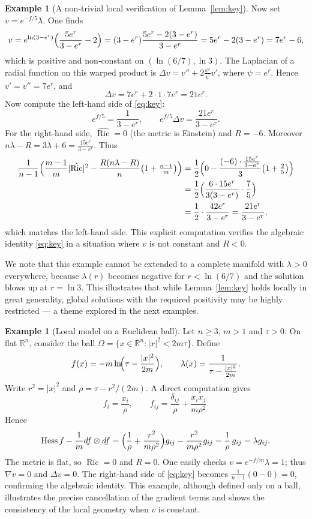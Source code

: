 \documentclass[12pt,a4paper]{article}
\newcommand{\Ric}{\operatorname{Ric}}
\newcommand{\Hess}{\operatorname{Hess}}
\theoremstyle{definition}
\newtheorem{example}[theorem]{Example}
\theoremstyle{definition}
\begin{document}
\begin{example}[A non‑trivial local verification of Lemma~\ref{lem:key}]
Now set $v = e^{-f/5}\lambda$.
One finds
\[
v = e^{\ln(3-e^{r})}\Bigl(\frac{5e^{r}}{3-e^{r}} - 2\Bigr)
= (3-e^{r})\frac{5e^{r} - 2(3-e^{r})}{3-e^{r}} = 5e^{r} - 2(3-e^{r}) = 7e^{r} - 6,
\]
which is positive and non‑constant on $(\ln(6/7),\ln 3)$.
The Laplacian of a radial function on this warped product is
$\Delta v = v'' + 2\frac{\psi'}{\psi}v'$, where $\psi=e^{r}$.
Hence $v' = v'' = 7e^{r}$, and
\[
\Delta v = 7e^{r} + 2\cdot 1 \cdot 7e^{r} = 21e^{r}.
\]
Now compute the left‑hand side of \eqref{eq:key}:
\[
e^{f/5} = \frac{1}{3-e^{r}},\qquad
e^{f/5}\Delta v = \frac{21e^{r}}{3-e^{r}}.
\]
For the right‑hand side, $\hat{\Ric}=0$ (the metric is Einstein) and $R=-6$.
Moreover $n\lambda - R = 3\lambda + 6 = \frac{15e^{r}}{3-e^{r}}$.
Thus
\begin{align*}
\frac{1}{n-1}\Bigl(\frac{m-1}{m}|\hat{\Ric}|^{2} -
\frac{R(n\lambda-R)}{n}\bigl(1+\tfrac{n-1}{m}\bigr)\Bigr)
&= \frac{1}{2}\Bigl(0 - \frac{(-6)\cdot\frac{15e^{r}}{3-e^{r}}}{3}\bigl(1+\tfrac{2}{5}\bigr)\Bigr)\\
&= \frac{1}{2}\Bigl( \frac{6\cdot 15e^{r}}{3(3-e^{r})}\cdot \frac{7}{5} \Bigr)\\
&= \frac{1}{2}\cdot \frac{42e^{r}}{3-e^{r}}
= \frac{21e^{r}}{3-e^{r}},
\end{align*}
which matches the left‑hand side.
This explicit computation verifies the algebraic identity \eqref{eq:key} in a situation where $v$ is not constant and $R<0$.

We note that this example cannot be extended to a complete manifold with $\lambda>0$ everywhere, because $\lambda(r)$ becomes negative for $r<\ln(6/7)$ and the solution blows up at $r=\ln 3$.
This illustrates that while Lemma~\ref{lem:key} holds locally in great generality, global solutions with the required positivity may be highly restricted --- a theme explored in the next examples.
\end{example}

\begin{example}[Local model on a Euclidean ball]\label{ex:local}
Let $n\ge 3$, $m>1$ and $\tau>0$.
On flat $\mathbb{R}^{n}$, consider the ball $\Omega = \{x\in\mathbb{R}^{n}:|x|^{2} < 2m\tau\}$.
Define
\[
f(x) = -m\ln\!\Bigl(\tau - \frac{|x|^{2}}{2m}\Bigr),\qquad
\lambda(x) = \frac{1}{\tau - \frac{|x|^{2}}{2m}}.
\]
Write $r^{2}=|x|^{2}$ and $\rho = \tau - r^{2}/(2m)$.
A direct computation gives
\[
f_{i} = \frac{x_{i}}{\rho},\qquad
f_{ij} = \frac{\delta_{ij}}{\rho} + \frac{x_{i}x_{j}}{m\rho^{2}}.
\]
Hence
\[
\Hess f - \frac{1}{m} df\otimes df
= \Bigl(\frac{1}{\rho} + \frac{r^{2}}{m\rho^{2}}\Bigr)g_{ij} - \frac{r^{2}}{m\rho^{2}}g_{ij}
= \frac{1}{\rho}\,g_{ij} = \lambda g_{ij}.
\]
The metric is flat, so $\Ric=0$ and $R=0$.
One easily checks $v = e^{-f/m}\lambda = 1$; thus $\nabla v=0$ and $\Delta v=0$.
The right‑hand side of \eqref{eq:key} becomes $\frac{1}{n-1}(0-0)=0$, confirming the algebraic identity.
This example, although defined only on a ball, illustrates the precise cancellation of the gradient terms and shows the consistency of the local geometry when $v$ is constant.
\end{example}
\end{document}
